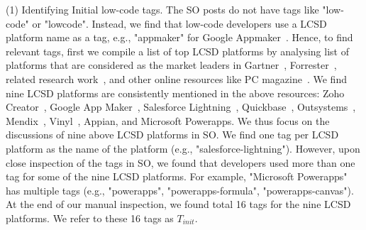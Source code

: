 (1) Identifying Initial low-code tags.
The SO posts do not have tags like "low-code" or "lowcode". Instead, we find that  low-code developers use a  LCSD platform name as a tag, e.g., "appmaker" for Google Appmaker~\cite{googleappmaker}. Hence, to find relevant tags, first we compile a list of top  LCSD platforms by analysing list of platforms that are considered as the market leaders in Gartner~\cite{vincent2019magic}, Forrester~\cite{rymer2019forrester}, related research work~\cite{sahay2020supporting}, and other online resources like PC magazine~\cite{pcmag}. We find nine  LCSD platforms are consistently mentioned in the above resources: Zoho Creator~\cite{zohocreator}, Google App Maker~\cite{googleappmaker}, Salesforce Lightning~\cite{salesforce}, Quickbase~\cite{quickbase}, Outsystems~\cite{quickbase}, Mendix~\cite{mendix}, Vinyl~\cite{vinyl}, Appian, and Microsoft Powerapps\cite{powerapps}. %
We thus focus on the discussions of nine above  LCSD platforms in SO. We find one tag per  LCSD platform as the name of the platform (e.g., "salesforce-lightning"). 
However, upon close inspection of the tags in SO, we found that developers used more than one tag for some of the nine  LCSD platforms. For example, "Microsoft Powerapps" has multiple tags (e.g., "powerapps", "powerapps-formula", "powerapps-canvas"). At the end of our manual inspection, we found total 16 tags for the nine  LCSD platforms. We refer to these 16 tags as $T_{init}$. 

